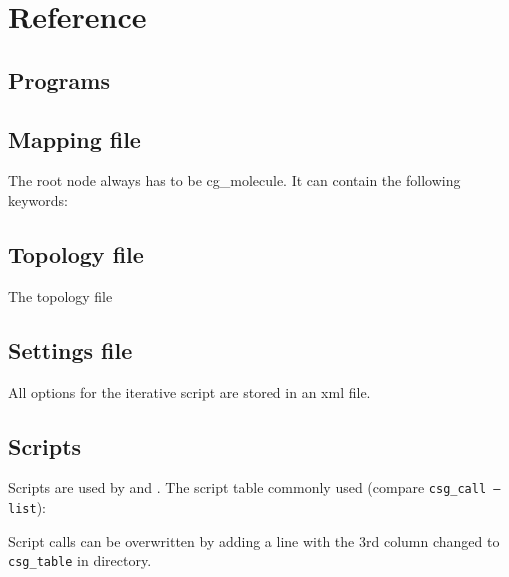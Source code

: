 \chapter{Reference}
\section{Programs}
\label{sec:ref_programs}

\section{Mapping file}
\label{sec:ref_mapping}
The root node always has to be cg\_molecule. It can contain the following keywords:



\section{Topology file}
\label{sec:ref_topology}
The \xml topology file



\section{Settings file}
All options for the iterative script are stored in an xml file.
\label{sec:ref_options}

\vfill

\section{Scripts}
\label{sec:csg_table}
Scripts are used by  and .
The script table commonly used (compare \texttt{csg\_call --list}): 

Script calls can be overwritten by adding a line with the 3rd column changed to \texttt{csg\_table} in  directory.

